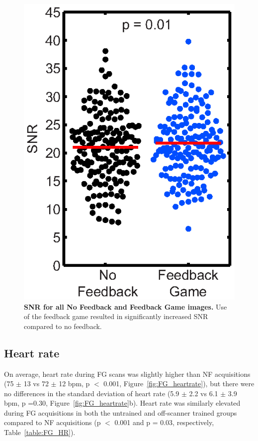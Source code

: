 	\begin{figure}
		\centering %
		\includegraphics{figures/gamepaper/05-SNR}
		\caption[SNR for all No Feedback and Feedback Game images]{\textbf{SNR for all No Feedback and Feedback Game images.} Use of the feedback game resulted in significantly increased SNR compared to no feedback.}
		\label{fig:FG_SNR}
	\end{figure}

\subsection{Heart rate}
	On average, heart rate during FG scans was slightly higher than NF acquisitions (75 $\pm$ 13 vs 72 $\pm$ 12 bpm, p $<$ 0.001, Figure~\ref{fig:FG_heartrate}), but there were no differences in the standard deviation of heart rate (5.9 $\pm$ 2.2 vs 6.1 $\pm$ 3.9 bpm, p =0.30, Figure~\ref{fig:FG_heartrate}b). Heart rate was similarly elevated during FG acquisitions in both the untrained and off-scanner trained groups compared to NF acquisitions (p $<$ 0.001 and p = 0.03, respectively, Table~\ref{table:FG_HR}).
	
